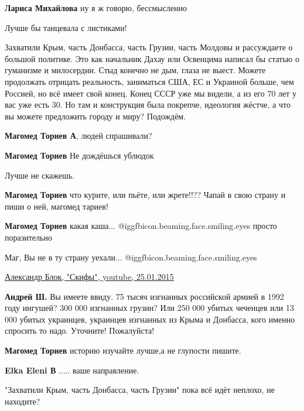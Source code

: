 \begin{itemize}
\begin{itemize}
\textbf{Лариса Михайлова} ну я ж говорю, бессмысленно
\end{itemize} %

Лучше бы танцевала с листиками!


Захватили Крым, часть Донбасса, часть Грузии, часть Молдовы и рассуждаете о
большой политике. Это как начальник Дахау или Освенцима написал бы статью о
гуманизме и милосердии. Стыд конечно не дым, глаза не выест. Можете продолжать
отрицать реальность, заниматься США, ЕС и Украиной больше, чем Россией, но всё
имеет свой конец. Конец СССР уже мы видели, а из его 70 лет у вас уже есть 30.
Но там и конструкция была покрепче, идеология жёстче, а что вы можете
предложить городу и миру? Подождём.

\begin{itemize} %
\textbf{Магомед Ториев А}, людей спрашивали?

\textbf{Магомед Ториев} Не дождёшься ублюдок

Лучше не скажешь.

\textbf{Магомед Ториев} что курите, или пьёте, или жрете!!?? Чапай в свою страну и пиши о ней, магомед тариев!

\textbf{Магомед Ториев} какая каша... @igg{fbicon.beaming.face.smiling.eyes} просто поразительно

Маг, Вы не в ту страну уехали... @igg{fbicon.beaming.face.smiling.eyes} 


\href{https://youtu.be/3u4WKbrxFd4?t=28}{%
Александр Блок, "Скифы", youtube, 25.01.2015%
}

\textbf{Андрей Ш.} Вы имеете ввиду. 75 тысяч изгнанных российской армией в 1992 году ингушей? 300 000 изгнанных грузин? Или 250 000 убитых чеченцев или 13 000 убитых украинцев, украинцев изгнанных из Крыма и Донбасса, кого именно спросить то надо. Уточните! Пожалуйста!

\textbf{Магомед Ториев} историю изучайте лучше,а не глупости пишите.

\textbf{Elka Eleni В} ..... ваше направление.

"Захватили Крым, часть Донбасса, часть Грузии" пока всё идёт неплохо, не находите?


\end{itemize}
\end{itemize}
